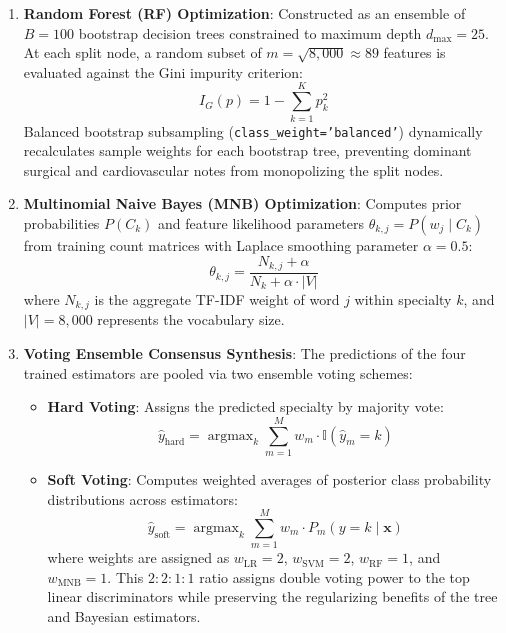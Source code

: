 \begin{enumerate}
    \item \textbf{Random Forest (RF) Optimization}:
    Constructed as an ensemble of $B = 100$ bootstrap decision trees constrained to maximum depth $d_{\text{max}} = 25$. At each split node, a random subset of $m = \sqrt{8,000} \approx 89$ features is evaluated against the Gini impurity criterion:
    \begin{equation}
        I_G(p) = 1 - \sum_{k=1}^{K} p_k^2
    \end{equation}
    Balanced bootstrap subsampling (\texttt{class\_weight='balanced'}) dynamically recalculates sample weights for each bootstrap tree, preventing dominant surgical and cardiovascular notes from monopolizing the split nodes.

    \item \textbf{Multinomial Naive Bayes (MNB) Optimization}:
    Computes prior probabilities $P(C_k)$ and feature likelihood parameters $\theta_{k,j} = P(w_j \mid C_k)$ from training count matrices with Laplace smoothing parameter $\alpha = 0.5$:
    \begin{equation}
        \theta_{k,j} = \frac{N_{k,j} + \alpha}{N_k + \alpha \cdot |V|}
    \end{equation}
    where $N_{k,j}$ is the aggregate TF-IDF weight of word $j$ within specialty $k$, and $|V| = 8,000$ represents the vocabulary size.

    \item \textbf{Voting Ensemble Consensus Synthesis}:
    The predictions of the four trained estimators are pooled via two ensemble voting schemes:
    \begin{itemize}
        \item \textbf{Hard Voting}: Assigns the predicted specialty by majority vote:
        \begin{equation}
            \hat{y}_{\text{hard}} = \operatorname{argmax}_k \sum_{m=1}^{M} w_m \cdot \mathbb{I}(\hat{y}_m = k)
        \end{equation}
        \item \textbf{Soft Voting}: Computes weighted averages of posterior class probability distributions across estimators:
        \begin{equation}
            \hat{y}_{\text{soft}} = \operatorname{argmax}_k \sum_{m=1}^{M} w_m \cdot P_m(y = k \mid \mathbf{x})
        \end{equation}
        where weights are assigned as $w_{\text{LR}} = 2$, $w_{\text{SVM}} = 2$, $w_{\text{RF}} = 1$, and $w_{\text{MNB}} = 1$. This $2:2:1:1$ ratio assigns double voting power to the top linear discriminators while preserving the regularizing benefits of the tree and Bayesian estimators.
    \end{itemize}
\end{enumerate}

